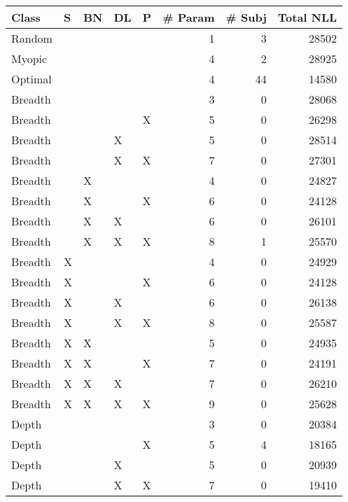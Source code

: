 \begin{tabular}{lllllrrr}
\toprule
   Class &  S & BN & DL &  P &  \# Param &  \# Subj &  Total NLL \\
\midrule
  Random &    &    &    &    &        1 &       3 &      28502 \\
  Myopic &    &    &    &    &        4 &       2 &      28925 \\
 Optimal &    &    &    &    &        4 &      44 &      14580 \\
 Breadth &    &    &    &    &        3 &       0 &      28068 \\
 Breadth &    &    &    &  X &        5 &       0 &      26298 \\
 Breadth &    &    &  X &    &        5 &       0 &      28514 \\
 Breadth &    &    &  X &  X &        7 &       0 &      27301 \\
 Breadth &    &  X &    &    &        4 &       0 &      24827 \\
 Breadth &    &  X &    &  X &        6 &       0 &      24128 \\
 Breadth &    &  X &  X &    &        6 &       0 &      26101 \\
 Breadth &    &  X &  X &  X &        8 &       1 &      25570 \\
 Breadth &  X &    &    &    &        4 &       0 &      24929 \\
 Breadth &  X &    &    &  X &        6 &       0 &      24128 \\
 Breadth &  X &    &  X &    &        6 &       0 &      26138 \\
 Breadth &  X &    &  X &  X &        8 &       0 &      25587 \\
 Breadth &  X &  X &    &    &        5 &       0 &      24935 \\
 Breadth &  X &  X &    &  X &        7 &       0 &      24191 \\
 Breadth &  X &  X &  X &    &        7 &       0 &      26210 \\
 Breadth &  X &  X &  X &  X &        9 &       0 &      25628 \\
   Depth &    &    &    &    &        3 &       0 &      20384 \\
   Depth &    &    &    &  X &        5 &       4 &      18165 \\
   Depth &    &    &  X &    &        5 &       0 &      20939 \\
   Depth &    &    &  X &  X &        7 &       0 &      19410 \\

\end{tabular}
